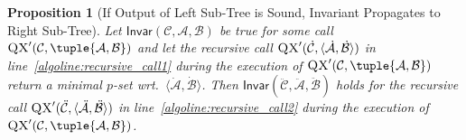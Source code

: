 \documentclass[]{elsarticle}
\newcommand{\scQX}{{\textsc{QX}}}
\newcommand{\ma}{\mathcal{A}}
\newcommand{\mb}{\mathcal{B}}
\newcommand{\mc}{\mathcal{C}}
\newcommand{\ba}{\bar{\ma}}
\newcommand{\bb}{\bar{\mb}}
\newcommand{\bc}{\bar{\mc}}
\newcommand{\Inv}{\mathsf{Invar}}
\newcommand{\ddmb}{\ddot{\mb}}
\newcommand{\ddma}{\ddot{\ma}}
\newcommand{\ddmc}{\ddot{\mc}}
\newcommand{\dmb}{\dot{\mb}}
\newcommand{\dma}{\dot{\ma}}
\newcommand{\dmc}{\dot{\mc}}
\newtheorem{proposition}{Proposition}[]{}
\begin{document}
	\begin{proposition}[If Output of Left Sub-Tree is Sound, Invariant Propagates to Right Sub-Tree]\label{prop:invar_propagates_to_first_call_in_line17}
		Let $\Inv(\mc,\ma,\mb)$ be true for some call $\scQX'(\mc,\tuple{\ma,\mb})$ and let the recursive call $\scQX'(\dmc,\langle\dma,\dmb\rangle)$ in line~\ref{algoline:recursive_call1} during the execution of $\scQX'(\mc,\tuple{\ma,\mb})$ return a minimal $p$-set wrt.\ $\langle\dma,\dmb\rangle$. Then $\Inv(\ddmc,\ddma,\ddmb)$ holds for the recursive call $\scQX'(\ddmc,\langle\ddma,\ddmb\rangle)$ in line~\ref{algoline:recursive_call2} during the execution of $\scQX'(\mc,\tuple{\ma,\mb})$.
	\end{proposition}
\end{document}
